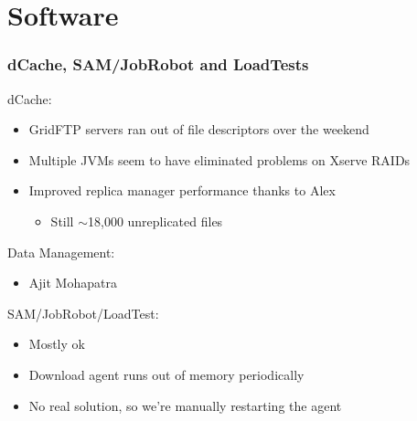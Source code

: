 \documentclass{beamer}
\newcommand{\ca}{\ensuremath{\sim}}
\begin{document}
\section{Software}
\begin{frame}
\frametitle{dCache, SAM/JobRobot and LoadTests}
dCache:
\begin{itemize}
    \item GridFTP servers ran out of file descriptors over the weekend
    \item Multiple JVMs seem to have eliminated problems on Xserve RAIDs\footnotemark{}
    \item Improved replica manager performance thanks to Alex
    \begin{itemize}
        \item Still \ca{}18,000 unreplicated files
    \end{itemize}
\end{itemize}

Data Management:
\begin{itemize}
    \item Ajit Mohapatra
\end{itemize}

SAM/JobRobot/LoadTest:
\begin{itemize}
    \item Mostly ok
    \item Download agent runs out of memory periodically
    \item No real solution, so we're manually restarting the agent
\end{itemize}

\end{frame}
\end{document}
